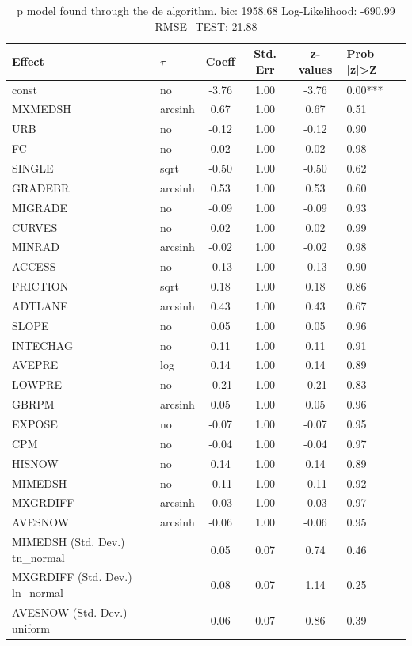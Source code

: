 \begin{table}
	\caption{p model found through the de algorithm. bic: 1958.68 Log-Likelihood: -690.99 RMSE_TEST: 21.88}
	\begin{center}
		\begin{tabular}{|l|l|c|c|c|l|}
			\hline
			Effect & $\tau$ & Coeff & Std. Err & z-values & Prob |z|>Z \\
			\hline
			const & no & -3.76 & 1.00 & -3.76 & 0.00*** \\
			\hline
			MXMEDSH & arcsinh & 0.67 & 1.00 & 0.67 & 0.51 \\
			\hline
			URB & no & -0.12 & 1.00 & -0.12 & 0.90 \\
			\hline
			FC & no & 0.02 & 1.00 & 0.02 & 0.98 \\
			\hline
			SINGLE & sqrt & -0.50 & 1.00 & -0.50 & 0.62 \\
			\hline
			GRADEBR & arcsinh & 0.53 & 1.00 & 0.53 & 0.60 \\
			\hline
			MIGRADE & no & -0.09 & 1.00 & -0.09 & 0.93 \\
			\hline
			CURVES & no & 0.02 & 1.00 & 0.02 & 0.99 \\
			\hline
			MINRAD & arcsinh & -0.02 & 1.00 & -0.02 & 0.98 \\
			\hline
			ACCESS & no & -0.13 & 1.00 & -0.13 & 0.90 \\
			\hline
			FRICTION & sqrt & 0.18 & 1.00 & 0.18 & 0.86 \\
			\hline
			ADTLANE & arcsinh & 0.43 & 1.00 & 0.43 & 0.67 \\
			\hline
			SLOPE & no & 0.05 & 1.00 & 0.05 & 0.96 \\
			\hline
			INTECHAG & no & 0.11 & 1.00 & 0.11 & 0.91 \\
			\hline
			AVEPRE & log & 0.14 & 1.00 & 0.14 & 0.89 \\
			\hline
			LOWPRE & no & -0.21 & 1.00 & -0.21 & 0.83 \\
			\hline
			GBRPM & arcsinh & 0.05 & 1.00 & 0.05 & 0.96 \\
			\hline
			EXPOSE & no & -0.07 & 1.00 & -0.07 & 0.95 \\
			\hline
			CPM & no & -0.04 & 1.00 & -0.04 & 0.97 \\
			\hline
			HISNOW & no & 0.14 & 1.00 & 0.14 & 0.89 \\
			\hline
			MIMEDSH & no & -0.11 & 1.00 & -0.11 & 0.92 \\
			\hline
			MXGRDIFF & arcsinh & -0.03 & 1.00 & -0.03 & 0.97 \\
			\hline
			AVESNOW & arcsinh & -0.06 & 1.00 & -0.06 & 0.95 \\
			\hline
			MIMEDSH (Std. Dev.) tn_normal &  & 0.05 & 0.07 & 0.74 & 0.46 \\
			\hline
			MXGRDIFF (Std. Dev.) ln_normal &  & 0.08 & 0.07 & 1.14 & 0.25 \\
			\hline
			AVESNOW (Std. Dev.) uniform &  & 0.06 & 0.07 & 0.86 & 0.39 \\
			\hline
		\end{tabular}
	\end{center}
\end{table}